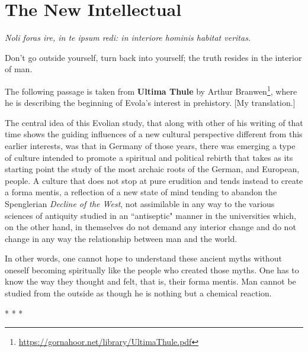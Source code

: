 \section{The New Intellectual}

\begin{quotex}
\emph{Noli foras ire, in te ipsum redi: in interiore hominis habitat veritas.}

Don't go outside yourself, turn back into yourself; the truth resides in the interior of man.


\end{quotex}
The following passage is taken from \textbf{Ultima Thule} by Arthur Branwen\footnote{\url{https://gornahoor.net/library/UltimaThule.pdf}}, where he is describing the beginning of Evola's interest in prehistory. [My translation.] 

\begin{quotex}
The central idea of this Evolian study, that along with other of his writing of that time shows the guiding influences of a new cultural perspective different from this earlier interests, was that in Germany of those years, there was emerging a type of culture intended to promote a spiritual and political rebirth that takes as its starting point the study of the most archaic roots of the German, and European, people. A culture that does not stop at pure erudition and tends instead to create a forma mentis, a reflection of a new state of mind tending to abandon the Spenglerian \emph{Decline of the West}, not assimilable in any way to the various sciences of antiquity studied in an ``antiseptic" manner in the universities which, on the other hand, in themselves do not demand any interior change and do not change in any way the relationship between man and the world. 

\end{quotex}
In other words, one cannot hope to understand these ancient myths without oneself becoming spiritually like the people who created those myths. One has to know the way they thought and felt, that is, their forma mentis. Man cannot be studied from the outside as though he is nothing but a chemical reaction.




\begin{center}* * *\end{center}

